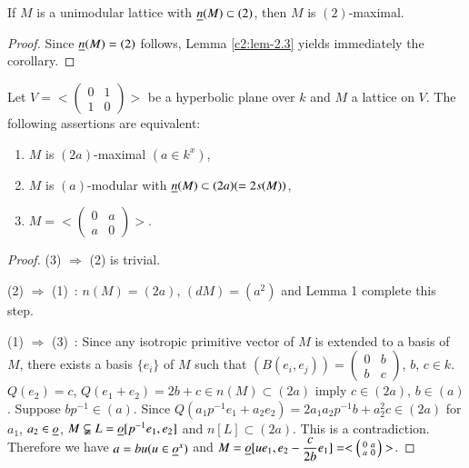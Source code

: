 \begin{coro*}
If $M$ is a unimodular lattice with $\underline{n}(M)\subset (2)$, then $M$
is $(2)$-maximal. 
\end{coro*}

\begin{proof}
Since $\underline{n}(M)=(2)$ follows, Lemma \ref{c2:lem-2.3} yields immediately
the corollary.
\end{proof}

\begin{lemma}\label{c2:lem-2.4}
Let $V=<\left(\begin{smallmatrix} 0 & 1\\ 1 & 0
\end{smallmatrix}\right)>$ be a hyperbolic plane over $k$ and $M$ a
lattice on $V$. The following assertions are equivalent:
\begin{enumerate}
\renewcommand{\labelenumi}{\rm(\theenumi)}
\item $M$ is $(2a)$-maximal $(a\in k^{x})$,

\item $M$ is $(a)$-modular with $\underline{n}(M)\subset (2a)(=2s(M))$,

\item $M=<\left(\begin{smallmatrix} 0 & a \\ a & 0
\end{smallmatrix}\right)>$.\pageoriginale
\end{enumerate}
\end{lemma}

\begin{proof}
(3) $\Rightarrow$ (2) is trivial.

(2) $\Rightarrow$ (1)~: $n(M)=(2a)$, $(dM)=(a^{2})$ and Lemma
  1 complete this step.

(1) $\Rightarrow$ (3)~: Since any isotropic primitive vector of $M$ is
  extended to a basis of $M$, there exists a basis $\{e_{i}\}$ of $M$
  such that $(B(e_{i},e_{j}))=\left(\begin{smallmatrix} 0 & b\\ b & c
  \end{smallmatrix}\right)$, $b$, $c\in k$. $Q(e_{2})=c$,
  $Q(e_{1}+e_{2})=2b+c\in n(M)\subset (2a)$ imply $c\in (2a)$, $b\in
  (a)$. Suppose $bp^{-1}\in (a)$. Since
  $Q(a_{1}p^{-1}e_{1}+a_{2}e_{2})=2a_{1}a_{2}p^{-1}b+a^{2}_{2}c\in(2a)$
  for $a_{1}$, $a_{2}\in \underline{o}$,
  $M\subsetneqq L=\underline{o}[p^{-1}e_{1},e_{2}]$ and
  $n[L]\subset (2a)$. This is a contradiction. Therefore we have
  $a=bu(u\in \underline{o}^{x})$ and
  $M=\underline{o}[ue_{1},e_{2}-\dfrac{c}{2b}e_{1}]=<\left(\begin{smallmatrix}
    0 & a\\ a & 0  \end{smallmatrix}\right)>$.
\end{proof}

